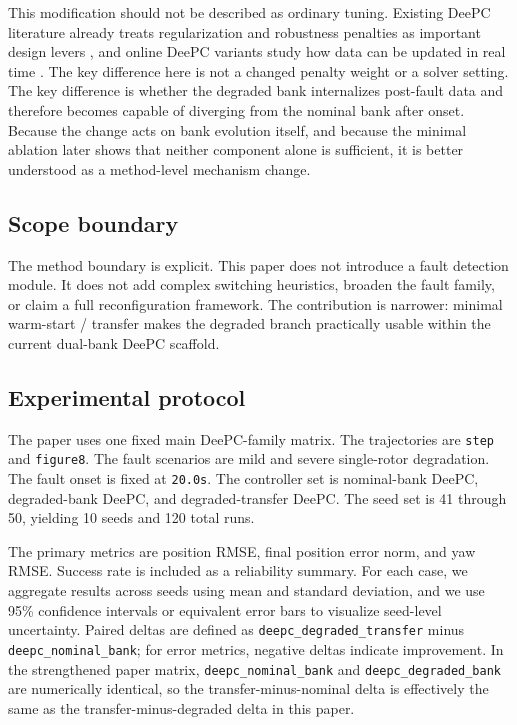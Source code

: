 \documentclass[12pt,a4paper]{article}
\begin{document}
This modification should not be described as ordinary tuning. Existing DeePC literature already treats regularization and robustness penalties as important design levers \cite{coulson2019regularized}, and online DeePC variants study how data can be updated in real time \cite{baros2022odeepc}. The key difference here is not a changed penalty weight or a solver setting. The key difference is whether the degraded bank internalizes post-fault data and therefore becomes capable of diverging from the nominal bank after onset. Because the change acts on bank evolution itself, and because the minimal ablation later shows that neither component alone is sufficient, it is better understood as a method-level mechanism change.

\subsection{Scope boundary}

The method boundary is explicit. This paper does not introduce a fault detection module. It does not add complex switching heuristics, broaden the fault family, or claim a full reconfiguration framework. The contribution is narrower: minimal warm-start / transfer makes the degraded branch practically usable within the current dual-bank DeePC scaffold.

\subsection{Experimental protocol}

The paper uses one fixed main DeePC-family matrix. The trajectories are \texttt{step} and \texttt{figure8}. The fault scenarios are mild and severe single-rotor degradation. The fault onset is fixed at \texttt{20.0s}. The controller set is nominal-bank DeePC, degraded-bank DeePC, and degraded-transfer DeePC. The seed set is 41 through 50, yielding 10 seeds and 120 total runs.

The primary metrics are position RMSE, final position error norm, and yaw RMSE. Success rate is included as a reliability summary. For each case, we aggregate results across seeds using mean and standard deviation, and we use 95\% confidence intervals or equivalent error bars to visualize seed-level uncertainty. Paired deltas are defined as \texttt{deepc\_degraded\_transfer} minus \texttt{deepc\_nominal\_bank}; for error metrics, negative deltas indicate improvement. In the strengthened paper matrix, \texttt{deepc\_nominal\_bank} and \texttt{deepc\_degraded\_bank} are numerically identical, so the transfer-minus-nominal delta is effectively the same as the transfer-minus-degraded delta in this paper.
\end{document}
